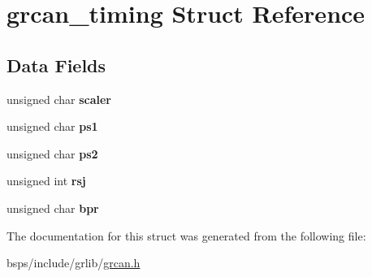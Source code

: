 \hypertarget{structgrcan__timing}{}\section{grcan\+\_\+timing Struct Reference}
\label{structgrcan__timing}
\subsection*{Data Fields}
\begin{DoxyCompactItemize}
\item 
\mbox{\label{structgrcan__timing_a77f255e46339b1ae5f22e72265f602b3}} 
unsigned char {\bfseries scaler}
\item 
\mbox{\label{structgrcan__timing_a837fa026dbb96a398c710375c7ea4140}} 
unsigned char {\bfseries ps1}
\item 
\mbox{\label{structgrcan__timing_ad8fd5a787b6e30065deacb23b61feb9f}} 
unsigned char {\bfseries ps2}
\item 
\mbox{\label{structgrcan__timing_a43caf7ae486e1aaa17e73f35bbf122a5}} 
unsigned int {\bfseries rsj}
\item 
\mbox{\label{structgrcan__timing_a79ce35827322b759200ef3f7bbd3e93a}} 
unsigned char {\bfseries bpr}
\end{DoxyCompactItemize}


The documentation for this struct was generated from the following file\+:\begin{DoxyCompactItemize}
\item 
bsps/include/grlib/\mbox{\hyperlink{grcan_8h}{grcan.\+h}}\end{DoxyCompactItemize}
